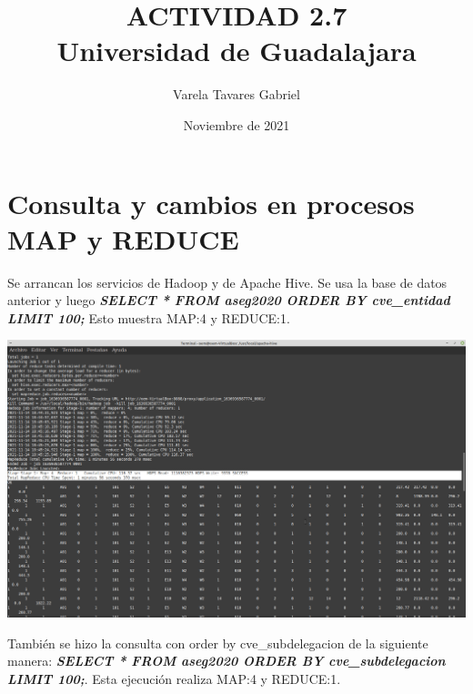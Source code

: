 \documentclass[16pt, spanish]{article}
\begin{document}
\title{{\textbf{ACTIVIDAD 2.7}}\\{\small Universidad de Guadalajara}\\}
\date{\small Noviembre de 2021}
\author{\small Varela Tavares Gabriel}
\maketitle



\section*{Consulta y cambios en procesos MAP y REDUCE}

Se arrancan los servicios de Hadoop y de Apache Hive. Se usa la base de datos anterior y luego \textbf{\textit{SELECT * FROM aseg2020 ORDER BY cve\_entidad LIMIT 100;}} Esto muestra MAP:4 y REDUCE:1.

\begin{center}
 \includegraphics[width=0.9\columnwidth]{consulta.png}\\
 \footnotesize{}
\end{center}
\vspace{.5cm}

También se hizo la consulta con order by cve\_subdelegacion de la siguiente manera: \textbf{\textit{SELECT * FROM aseg2020 ORDER BY cve\_subdelegacion LIMIT 100;}}. Esta ejecución realiza MAP:4 y REDUCE:1.
%
\end{document}

